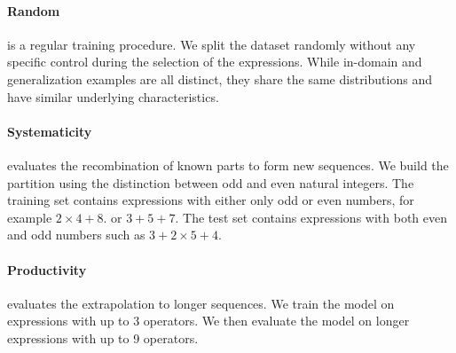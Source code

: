 

\paragraph{Random} is a regular training procedure. We split the dataset randomly without any specific control during the selection of the expressions. While in-domain and generalization examples are all distinct, they share the same distributions and have similar underlying characteristics.

\paragraph{Systematicity} evaluates the recombination of known parts to form new sequences. We build the partition using the distinction between odd and even natural integers. The training set contains expressions with either only odd or even numbers, for example $2 \times 4 + 8$. or $3 + 5 + 7$. The test set contains expressions with both even and odd numbers such as $3 + 2 \times 5 + 4$.

\paragraph{Productivity} evaluates the extrapolation to longer sequences. We train the model on expressions with  up to 3 operators. We then evaluate the model on longer expressions with up to 9 operators.


